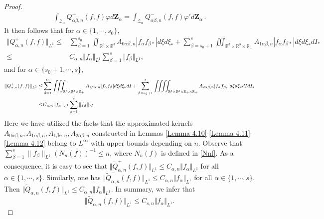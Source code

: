 \documentclass[reqno,11pt]{amsart}
\numberwithin{equation}{section}
\def\R{\mathbb{R}}
\begin{document}
\begin{proof}
\begin{equation*}
\begin{aligned}
    \int_{\mathcal{Z}_\alpha }Q^+_{\alpha \beta ,n}(f,f) \varphi d \mathbf{Z}_\alpha = \int_{\mathcal{Z}_\alpha } Q^-_{ \alpha \beta,n }(f,f) \varphi' d \mathbf{Z}_\alpha \,.
  \end{aligned}
\end{equation*}
It then follows that for $\alpha \in \{1,\cdots , s_0\}$,
	\begin{equation*}
		\begin{aligned}
			\Vert	Q^+_{\alpha ,n} (f,f)\Vert_{L^1} 
			\leq &\sum \limits_{\beta =1}^{s_0} \iint_{\R^3 \times \R^3 } A_{0\alpha \beta ,n} | f_\alpha f_{\beta *} | d\xi d\xi_*  + \sum \limits_{\beta =s_0+ 1}^{s} \iiint_{\R^3 \times \R^3 \times \R_+ } A_{1\alpha \beta ,n} | f_\alpha f_{\beta *} | d\xi d\xi_*  dI_*\\
			\leq & C_{\alpha ,n} \Vert f_\alpha \Vert_{L^1} \sum \limits_{\beta =1}^{s}  \Vert f_{\beta } \Vert_{L^1},
		\end{aligned}
	\end{equation*}
	and for $\alpha \in \{s_0+1,\cdots , s\}$,
	\begin{equation*}{\small
		\begin{aligned}
			\Vert	Q^+_{\alpha ,n} (f,f)\Vert_{L^1}
			\leq & \sum \limits_{\beta =1}^{s_0} \iiint_{\R^3 \times \R^3 \times \R_+ } A_{1\beta \alpha ,n} | f_\alpha f_{\beta } | d\xi d\xi_* dI + \sum \limits_{\beta =s_0+ 1}^{s} \iiiint_{\R^3 \times \R^3 \times \R_+ \times \R_+} A_{2 \alpha \beta ,n} | f_\alpha f_{\beta_*} | d\xi d\xi_*dI dI_* \\
			\leq & C_{\alpha ,n} \Vert f_\alpha \Vert_{L^1} \sum \limits_{\beta =1}^{s}  \Vert f_{\beta } \Vert_{L^1}.
		\end{aligned}}
	\end{equation*}
Here we have utilized the facts that the approximated kernels $A_{0 \alpha \beta, n}, A_{1 \alpha \beta, n}, A_{1 \beta \alpha, n}, A_{2 \alpha \beta, n}$ constructed in Lemmas \ref{Lemma 4.10}-\ref{Lemma 4.11}-\ref{Lemma 4.12} belong to $L^\infty$ with upper bounds depending on $n$. Observe that $\sum_{\beta = 1}^{s}\| f_\beta \|_{L^1} ( N_n (f) )^{-1} \leq n$, where $N_n (f)$ is defined in \eqref{Nnf}. As a consequence, it is easy to see that $\Vert \tilde{Q}^+_{\alpha , n} (f,f) \Vert_{L^1}\leq C_{\alpha , n} \Vert f_{\alpha} \Vert_{L^1}$ for all $\alpha \in \{1,\cdots , s\}$. Similarly, one has $\Vert \tilde{Q}^-_{\alpha , n} (f,f) \Vert_{L^1}\leq C_{\alpha , n} \Vert f_{\alpha} \Vert_{L^1}$ for all $\alpha \in \{1,\cdots , s\}$. Then $\Vert \tilde{Q}_{\alpha , n} (f,f) \Vert_{L^1}\leq C_{\alpha , n} \Vert f_{\alpha} \Vert_{L^1}$. In summary, we infer that
	\begin{equation}
	\Vert \tilde{Q}_{\alpha , n} (f,f) \Vert_{L^1}\leq C_{s , n} \Vert f_{\alpha} \Vert_{L^1}.
	\end{equation}


\end{proof}
\end{document}
